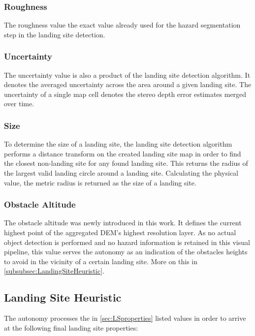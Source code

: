 \subsubsection{Roughness}

The roughness value the exact value already used for the hazard segmentation step in the landing site detection. 

\subsubsection{Uncertainty}

The uncertainty value is also a product of the landing site detection algorithm. It denotes the averaged uncertainty across the area around a given landing site. The uncertainty of a single map cell denotes the stereo depth error estimates merged over time.

\subsubsection{Size}

To determine the size of a landing site, the landing site detection algorithm performs a distance transform on the created landing site map in order to find the closest non-landing site for any found landing site. This returns the radius of the largest valid landing circle around a landing site. Calculating the physical value, the metric radius is returned as the size of a landing site.

\subsubsection{Obstacle Altitude}\label{subsec:obstacle_altitude}

The obstacle altitude was newly introduced in this work. It defines the current highest point of the aggregated DEM's highest resolution layer. As no actual object detection is performed and no hazard information is retained in this visual pipeline, this value serves the autonomy as an indication of the obstacles heights to avoid in the vicinity of a certain landing site. More on this in \cref{subsubsec:LandingSiteHeuristic}.

\subsection{Landing Site Heuristic}

The autonomy processes the in \cref{sec:LSproperties} listed values in order to arrive at the following final landing site properties:

